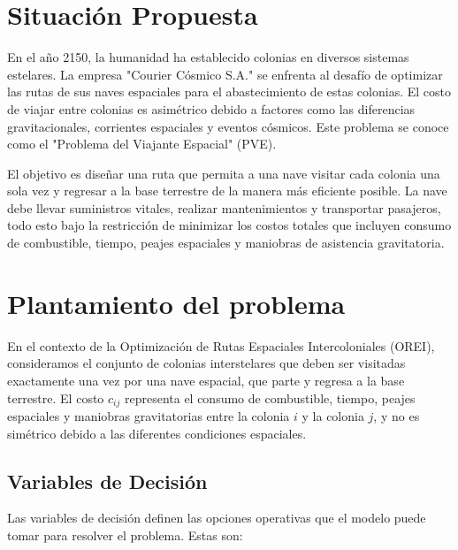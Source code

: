 \documentclass[
	spanish, %
	oneside
]{article}
\begin{document}
\templateFinalcfg


\section*{Situación Propuesta}

En el año 2150, la humanidad ha establecido colonias en diversos sistemas estelares. La empresa "Courier Cósmico S.A." se enfrenta al desafío de optimizar las rutas de sus naves espaciales para el abastecimiento de estas colonias. El costo de viajar entre colonias es asimétrico debido a factores como las diferencias gravitacionales, corrientes espaciales y eventos cósmicos. Este problema se conoce como el "Problema del Viajante Espacial" (PVE).
\vspace{12pt}

\noindent El objetivo es diseñar una ruta que permita a una nave visitar cada colonia una sola vez y regresar a la base terrestre de la manera más eficiente posible. La nave debe llevar suministros vitales, realizar mantenimientos y transportar pasajeros, todo esto bajo la restricción de minimizar los costos totales que incluyen consumo de combustible, tiempo, peajes espaciales y maniobras de asistencia gravitatoria.
\vspace{12pt}

\newpage



\section{Plantamiento del problema}

En el contexto de la Optimización de Rutas Espaciales Intercoloniales (OREI), consideramos el conjunto de colonias interstelares que deben ser visitadas exactamente una vez por una nave espacial, que parte y regresa a la base terrestre. El costo \( c_{ij} \) representa el consumo de combustible, tiempo, peajes espaciales y maniobras gravitatorias entre la colonia \( i \) y la colonia \( j \), y no es simétrico debido a las diferentes condiciones espaciales.

\subsection*{Variables de Decisión}

Las variables de decisión definen las opciones operativas que el modelo puede tomar para resolver el problema. Estas son:
\end{document}
